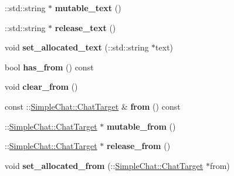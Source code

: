 \begin{DoxyCompactItemize}
\item 
\hypertarget{classSimpleChat_1_1ChatMessage_ab27d1c1071ce19816f6bb328a0c2c667}{\-::std\-::string $\ast$ {\bfseries mutable\-\_\-text} ()}\label{classSimpleChat_1_1ChatMessage_ab27d1c1071ce19816f6bb328a0c2c667}

\item 
\hypertarget{classSimpleChat_1_1ChatMessage_ab57c4fa5ee811a57f2ed261b6e4086a7}{\-::std\-::string $\ast$ {\bfseries release\-\_\-text} ()}\label{classSimpleChat_1_1ChatMessage_ab57c4fa5ee811a57f2ed261b6e4086a7}

\item 
\hypertarget{classSimpleChat_1_1ChatMessage_ae863497ba313a809ee4ce02dc40632f9}{void {\bfseries set\-\_\-allocated\-\_\-text} (\-::std\-::string $\ast$text)}\label{classSimpleChat_1_1ChatMessage_ae863497ba313a809ee4ce02dc40632f9}

\item 
\hypertarget{classSimpleChat_1_1ChatMessage_a4aceacb01a84a74b1cb9fb537d087461}{bool {\bfseries has\-\_\-from} () const }\label{classSimpleChat_1_1ChatMessage_a4aceacb01a84a74b1cb9fb537d087461}

\item 
\hypertarget{classSimpleChat_1_1ChatMessage_a280ea2eeb3c38b1921cdbd89dad08fdc}{void {\bfseries clear\-\_\-from} ()}\label{classSimpleChat_1_1ChatMessage_a280ea2eeb3c38b1921cdbd89dad08fdc}

\item 
\hypertarget{classSimpleChat_1_1ChatMessage_a64cab764c417f41d8c7856a45a97ee0c}{const \-::\hyperlink{classSimpleChat_1_1ChatTarget}{Simple\-Chat\-::\-Chat\-Target} \& {\bfseries from} () const }\label{classSimpleChat_1_1ChatMessage_a64cab764c417f41d8c7856a45a97ee0c}

\item 
\hypertarget{classSimpleChat_1_1ChatMessage_a17867bdc8208522f8dbe25f08beb37c2}{\-::\hyperlink{classSimpleChat_1_1ChatTarget}{Simple\-Chat\-::\-Chat\-Target} $\ast$ {\bfseries mutable\-\_\-from} ()}\label{classSimpleChat_1_1ChatMessage_a17867bdc8208522f8dbe25f08beb37c2}

\item 
\hypertarget{classSimpleChat_1_1ChatMessage_a98cfe09cbfa47ce5a3391e7b6b050c9d}{\-::\hyperlink{classSimpleChat_1_1ChatTarget}{Simple\-Chat\-::\-Chat\-Target} $\ast$ {\bfseries release\-\_\-from} ()}\label{classSimpleChat_1_1ChatMessage_a98cfe09cbfa47ce5a3391e7b6b050c9d}

\item 
\hypertarget{classSimpleChat_1_1ChatMessage_aecb81c970857879f6e8261d1cfb4ecaf}{void {\bfseries set\-\_\-allocated\-\_\-from} (\-::\hyperlink{classSimpleChat_1_1ChatTarget}{Simple\-Chat\-::\-Chat\-Target} $\ast$from)}\label{classSimpleChat_1_1ChatMessage_aecb81c970857879f6e8261d1cfb4ecaf}


\end{DoxyCompactItemize}
